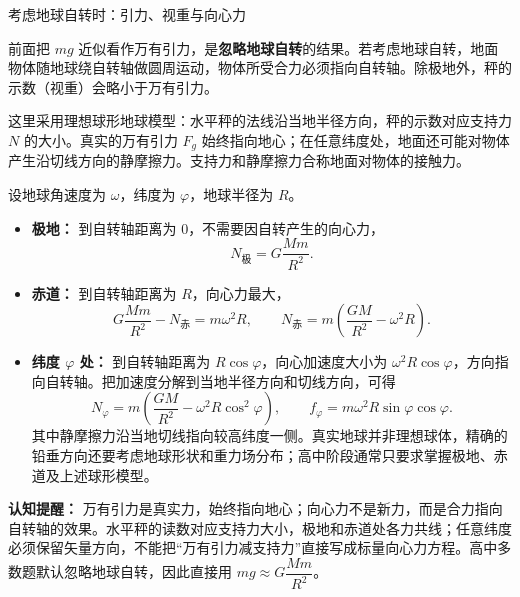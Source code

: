 \begin{conceptbox}{考虑地球自转时：引力、视重与向心力}

\vspace{0.2em}
前面把 $mg$ 近似看作万有引力，是\textbf{忽略地球自转}的结果。若考虑地球自转，地面物体随地球绕自转轴做圆周运动，物体所受合力必须指向自转轴。除极地外，秤的示数（视重）会略小于万有引力。

这里采用理想球形地球模型：水平秤的法线沿当地半径方向，秤的示数对应支持力 $N$ 的大小。真实的万有引力 $F_g$ 始终指向地心；在任意纬度处，地面还可能对物体产生沿切线方向的静摩擦力。支持力和静摩擦力合称地面对物体的接触力。

\vspace{0.6em}
\begin{center}


\label{fig:earth-rotation-weight}
\end{center}

设地球角速度为 $\omega$，纬度为 $\varphi$，地球半径为 $R$。

\begin{itemize}
  \item \textbf{极地：} 到自转轴距离为 $0$，不需要因自转产生的向心力，
  \[
  N_{\text{极}}=G\frac{Mm}{R^2}.
  \]
  \item \textbf{赤道：} 到自转轴距离为 $R$，向心力最大，
  \[
  G\frac{Mm}{R^2}-N_{\text{赤}}=m\omega^2R,
  \qquad
  N_{\text{赤}}=m\left(\frac{GM}{R^2}-\omega^2R\right).
  \]
  \item \textbf{纬度 $\varphi$ 处：} 到自转轴距离为 $R\cos\varphi$，向心加速度大小为 $\omega^2R\cos\varphi$，方向指向自转轴。把加速度分解到当地半径方向和切线方向，可得
  \[
  \boxed{N_{\varphi}=m\left(\frac{GM}{R^2}-\omega^2R\cos^2\varphi\right)},
  \qquad
  \boxed{f_{\varphi}=m\omega^2R\sin\varphi\cos\varphi}.
  \]
  其中静摩擦力沿当地切线指向较高纬度一侧。真实地球并非理想球体，精确的铅垂方向还要考虑地球形状和重力场分布；高中阶段通常只要求掌握极地、赤道及上述球形模型。
\end{itemize}

\vspace*{0.35em}
\textbf{认知提醒：} 万有引力是真实力，始终指向地心；向心力不是新力，而是合力指向自转轴的效果。水平秤的读数对应支持力大小，极地和赤道处各力共线；任意纬度必须保留矢量方向，不能把“万有引力减支持力”直接写成标量向心力方程。高中多数题默认忽略地球自转，因此直接用 $mg\approx G\dfrac{Mm}{R^2}$。

\end{conceptbox}

